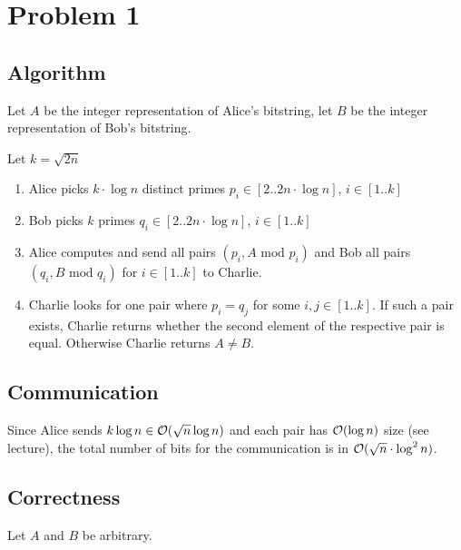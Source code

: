 \section*{Problem 1}

\subsection*{Algorithm}

Let $A$ be the integer representation of Alice's bitstring, let $B$ be the integer representation of Bob's bitstring.

Let $k = \sqrt{2n}$

\begin{enumerate}
    \item Alice picks $k\cdot\log n$ distinct primes $p_i \in [2..2n\cdot\log n]$, $i \in [1..k]$
    \item Bob picks $k$ primes $q_i \in [2..2n\cdot\log n]$, $i \in [1..k]$
    \item Alice computes and send all pairs $(p_i, A \text{ mod } p_i)$ and Bob all pairs $(q_i, B \text{ mod } q_i)$ for $i \in [1..k]$ to Charlie.
    \item Charlie looks for one pair where $p_i = q_j$ for some $i, j \in [1..k]$. If such a pair exists, Charlie returns whether the second element of the respective pair is equal. Otherwise Charlie returns $A \neq B$.
\end{enumerate}{}

\subsection*{Communication}

Since Alice sends $k \log n \in \mathcal{O}(\sqrt{n}\log n)$ and each pair has $\mathcal{O}(\log n)$ size (see lecture), the total number of bits for the communication is in $\mathcal{O}(\sqrt{n} \cdot \log^2 n)$.

\subsection*{Correctness}

Let $A$ and $B$ be arbitrary.

